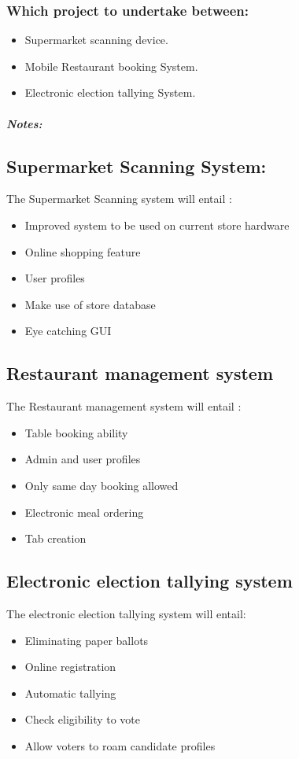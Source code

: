 \documentclass{article}
\begin{document}
\subsubsection*{ Which project to undertake between:}
\begin{itemize}
	\item Supermarket scanning device.
	\item Mobile Restaurant booking System.
	\item Electronic election tallying System. 
\end{itemize}

\subparagraph{Notes:\\}

\subsection{Supermarket Scanning System:}
The Supermarket Scanning system will entail :\\  
\begin{itemize}
	\item Improved system to be used on current store hardware
	\item Online shopping feature
	\item User profiles
	\item Make use of store database
	\item Eye catching GUI
\end{itemize}

\subsection{Restaurant management system}
The Restaurant management system will entail :\\
\begin{itemize}
	\item Table booking ability
	\item Admin and user profiles
	\item Only same day booking allowed
	\item Electronic meal ordering 
	\item Tab creation
\end{itemize}

\subsection{Electronic election tallying system}
The electronic election tallying system will entail: \\
\begin{itemize}
	\item Eliminating paper ballots
	\item Online registration 
	\item Automatic tallying
	\item Check eligibility to vote
	\item Allow voters to roam candidate profiles
\end{itemize}
\end{document}
